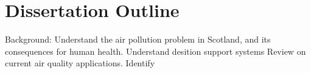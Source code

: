 \section{Dissertation Outline}
Background:
Understand the air pollution problem in Scotland, and its consequences for human health.
Understand desition support systems
Review on current air quality applications.
Identify 	